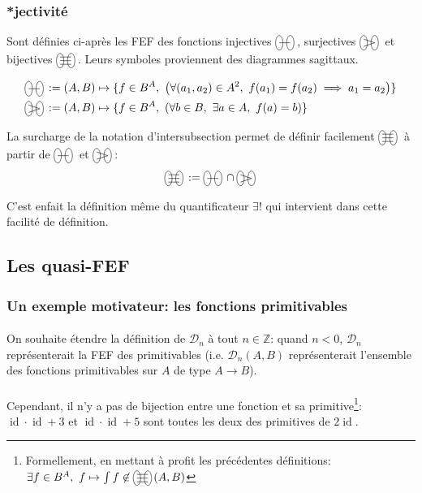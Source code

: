 \documentclass{article}
\newcommand{\Z}{{\mathbb Z}}
\newcommand{\cD}{{\mathcal D}}
\newcommand{\id}{\operatorname{id}}
\newcommand{\bijectivefunctions}{%
	\begin{tikzpicture}[scale=1.5, baseline=-0.5ex]%
		\draw (-0.75ex,0) ellipse (0.5ex and 1ex);
		\draw (0.75ex,0) ellipse (0.5ex and 1ex);
		\draw (-0.75ex,0.5ex) -- (0.75ex,0.5ex);
		\draw (-0.75ex,0) -- (0.75ex,0);
		\draw (-0.75ex,-0.5ex) -- (0.75ex,-0.5ex);
	\end{tikzpicture}\,%
}
\newcommand{\injectivefunctions}{%
	\begin{tikzpicture}[scale=1.5, baseline=-0.5ex]%
		\draw (-0.75ex,0) ellipse (0.5ex and 1ex);
		\draw (0.75ex,0) ellipse (0.5ex and 1ex);
		\draw (-0.75ex,0) -- (0.75ex,0);
	\end{tikzpicture}\,%
}
\newcommand{\surjectivefunctions}{%
	\begin{tikzpicture}[scale=1.5, baseline=-0.5ex]%
		\draw (-0.75ex,0) ellipse (0.5ex and 1ex);
		\draw (0.75ex,0) ellipse (0.5ex and 1ex);
		\draw (-0.75ex,0.5ex) -- (0.75ex,0);
		\draw (-0.75ex,-0.5ex) -- (0.75ex,0);
	\end{tikzpicture}\,%
}
\begin{document}
\subsubsection{*jectivité}

Sont définies ci-après les FEF des fonctions injectives $\injectivefunctions$, surjectives $\surjectivefunctions$ et bijectives $\bijectivefunctions$. Leurs symboles proviennent des diagrammes sagittaux.

\begin{align*}
	\injectivefunctions &:= (A, B) \mapsto  \{f\in B^A,\ \left( \forall (a_1,a_2)\in A^2,\ f(a_1)=f(a_2)\implies a_1 = a_2 \right) \} \\
	\surjectivefunctions &:= (A, B) \mapsto \{f\in B^A,\ \left( \forall b\in B,\ \exists a\in A,\ f(a)=b \right) \} \\
\end{align*}

La surcharge de la notation d'intersubsection permet de définir facilement $\bijectivefunctions$ à partir de $\injectivefunctions$ et $\surjectivefunctions$: 
\[
	\bijectivefunctions := \injectivefunctions \cap \surjectivefunctions
\] 

C'est enfait la définition même du quantificateur $\exists!$ qui intervient dans cette facilité de définition.

\subsection{Les quasi-FEF}

\subsubsection{Un exemple motivateur: les fonctions primitivables}

\paragraph{}
On souhaite étendre la définition de $\cD_n$ à tout $n \in \Z$: quand $n < 0$, $\cD_n$ représenterait la FEF des primitivables (i.e. $\cD_n(A, B)$ représenterait l'ensemble des fonctions primitivables sur $A$ de type $A\to B$).

\paragraph{}
Cependant, il n'y a pas de bijection entre une fonction et sa primitive\footnote{Formellement, en mettant à profit les précédentes définitions: $\exists f \in B^A,\ f\mapsto \int f \not\in \bijectivefunctions(A, B)$}: $\id \cdot \id + 3$ et $\id \cdot \id + 5$ sont toutes les deux des primitives de $2\id$.
\end{document}
